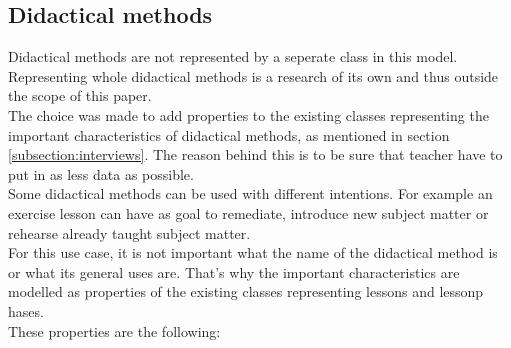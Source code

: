 \documentclass[a4paper]{report}
\begin{document}
    \subsection{Didactical methods}
    Didactical methods are not represented by a seperate class in this model. Representing whole didactical methods is a research of its own and thus outside the scope of this paper.\\
    The choice was made to add properties to the existing classes representing the important characteristics of didactical methods, as mentioned in section \ref{subsection:interviews}.
    The reason behind this is to be sure that teacher have to put in as less data as possible.\\
    Some didactical methods can be used with different intentions.
    For example an exercise lesson can have as goal to remediate, introduce new subject matter or rehearse already taught subject matter.\\
    For this use case, it is not important what the name of the didactical method is or what its general uses are.
    That's why the important characteristics are modelled as properties of the existing classes representing lessons and lessonp hases.\\
    These properties are the following:
\end{document}
